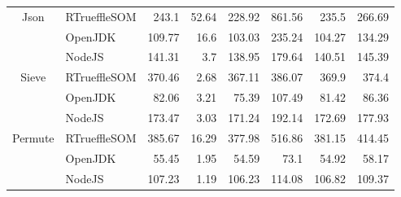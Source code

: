 \begin{center}
\begin{tabular}{ c | l r r r r r r}
\multirow{3}{*}{ Json } & RTrueffleSOM & 243.1 & 52.64 & 228.92 & 861.56 & 235.5 & 266.69 \\
& OpenJDK & 109.77 & 16.6 & 103.03 & 235.24 & 104.27 & 134.29 \\
& NodeJS & 141.31 & 3.7 & 138.95 & 179.64 & 140.51 & 145.39 \\
\midrule

\multirow{3}{*}{ Sieve } & RTrueffleSOM & 370.46 & 2.68 & 367.11 & 386.07 & 369.9 & 374.4 \\
& OpenJDK & 82.06 & 3.21 & 75.39 & 107.49 & 81.42 & 86.36 \\
& NodeJS & 173.47 & 3.03 & 171.24 & 192.14 & 172.69 & 177.93 \\
\midrule

\multirow{3}{*}{ Permute } & RTrueffleSOM & 385.67 & 16.29 & 377.98 & 516.86 & 381.15 & 414.45 \\
& OpenJDK & 55.45 & 1.95 & 54.59 & 73.1 & 54.92 & 58.17 \\
& NodeJS & 107.23 & 1.19 & 106.23 & 114.08 & 106.82 & 109.37 \\
\midrule

\end{tabular}
\end{center}